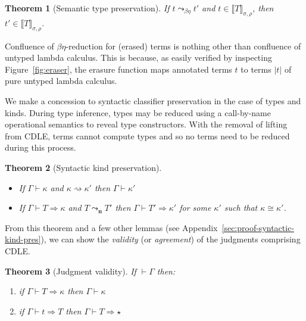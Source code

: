 \documentclass{article}
\newcommand{\interp}[1]{\llbracket #1 \rrbracket}
\newcommand{\leadstoc}[0]{\ensuremath{\leadsto_{\mathbf{n}}}}
\newcommand{\tpsynth}[0]{\Rightarrow}
\newtheorem{theorem}{Theorem}
\newtheorem{lemma}[theorem]{Lemma}
\begin{document}
\begin{theorem}[Semantic type preservation]
  If $t \leadsto_{\beta\eta} t'$ and $t\in\interp{T}_{\sigma,\rho}$, then $t'\in\interp{T}_{\sigma,\rho}$.
\end{theorem}

  Confluence of $\beta\eta$-reduction for (erased)
  terms is nothing other than confluence of untyped lambda calculus.
  This is because, as easily verified by inspecting
  Figure~\ref{fig:eraser}, the erasure function maps annotated terms
  $t$ to terms $|t|$ of pure untyped lambda calculus.
\begin{comment}
  \begin{lemma}
    If $t$ is an annotated term of CDLE, then $|t|$ is a term of pure untyped lambda calculus.
    \end{lemma}
\end{comment}    

We make a concession to syntactic classifier preservation in the case of types
and kinds.
During type inference, types may be reduced using a call-by-name operational
semantics to reveal type constructors.
With the removal of lifting from CDLE, terms cannot compute types and so no
terms need to be reduced during this process.

\begin{theorem}[Syntactic kind preservation]
  \label{thm:syntactic-kind-pres}
  \
  \begin{itemize}
  \item If \(\Gamma \vdash \kappa\) and \(\kappa \rightsquigarrow \kappa'\) then
    \(\Gamma \vdash \kappa'\)
    
  \item If \(\Gamma \vdash T \tpsynth \kappa\) and \(T \leadstoc T'\) then
    \(\Gamma \vdash T' \tpsynth \kappa'\) for some \(\kappa'\) such that \(\kappa
    \cong \kappa'\).
  \end{itemize}

\end{theorem}

From this theorem and a few other lemmas (see
Appendix~\ref{sec:proof-syntactic-kind-pres}), we can show the \emph{validity}
(or \emph{agreement}) of the judgments comprising CDLE.

\begin{theorem}[Judgment validity]
  \label{thm:judge-valid}
  If \(\vdash \Gamma\) then:
  \begin{enumerate}
  \item if \(\Gamma \vdash T \tpsynth \kappa\) then \(\Gamma \vdash \kappa\)
    
  \item if \(\Gamma \vdash t \tpsynth T\) then \(\Gamma \vdash T \tpsynth \star\)
  \end{enumerate}
\end{theorem}
\end{document}
